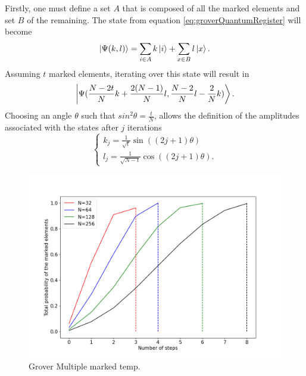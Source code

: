 \documentclass[../../dissertation.tex]{subfiles}
\begin{document}
Firstly, one must define a set $A$ that is composed of all the marked elements
and set $B$ of the remaining. The state from equation
\ref{eq:groverQuantumRegister} will become
\begin{equation}
	\ket{\Psi(k,l)} =\sum_{i\in A} k\ket{i} + \sum_{x \in B}l\ket{x}.
\end{equation}
Assuming $t$ marked elements, iterating over this state will result in
\begin{equation}
	\ket{\Psi(\frac{N-2t}{N}k + \frac{2(N-1)}{N}l, \frac{N-2}{N}l - \frac{2}{N}k)}.
\end{equation}
Choosing an angle $\theta$ such that $sin^2\theta=\frac{t}{N}$, allows the
definition of the amplitudes associated with the states after $j$ iterations 
\begin{equation}
	\begin{cases}
		k_{j} =\frac{1}{\sqrt{t}} \sin{((2j+1)\theta)} 
		\\l_{j} = \frac{1}{\sqrt{N-t}}\cos{((2j+1)\theta)}.
	\end{cases}\label{eq:groverKandJ2}
\end{equation}
\begin{figure}[h]
	\centering
	\includegraphics[scale=0.40]{img/Grover/GroverMultipleMarked3264128256}
	\caption{Grover Multiple marked temp.} 
	\label{fig:groverMultipleMarked3264128256}
\end{figure}
\end{document}

